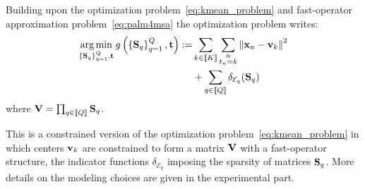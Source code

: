 Building upon the \kmeans optimization problem~\eqref{eq:kmean_problem} and fast-operator approximation problem~\eqref{eq:palm4msa} the \qkmeans optimization problem 
writes:
%
\begin{align}
 \operatorname*{arg\,min}_{\left\{{\mathbf{S}}_q\right\}_{q=1}^{Q}, {\mathbf{t}}} g\left(\left\{{\mathbf{S}}_q\right\}_{q=1}^{Q}, {\mathbf{t}}\right)
 := & \sum_{k\in\left \llbracket K\right \rrbracket} \sum_{\substack{n\\t_n = k}} \left\|{\mathbf{x}}_n -{\mathbf{v}}_k\right\|^2 \nonumber \\
 & + \sum_{q\in\left \llbracket Q\right \rrbracket} \delta_{\mathcal{E}_q}({\mathbf{S}}_q)
 \label{eq:objective}
\end{align}
where ${\mathbf{V}} = \prod_{q\in\left \llbracket Q\right \rrbracket}{\mathbf{S}}_q$.

%
This is a constrained version of the \kmeans optimization problem~\eqref{eq:kmean_problem} in which centers ${\mathbf{v}}_k$ are constrained to form a matrix ${\mathbf{V}}$ with a fast-operator structure, the indicator functions $\delta_{\mathcal{E}_q}$ imposing the sparsity of matrices ${\mathbf{S}}_q$.
More details on the modeling choices are given in the experimental part. %

